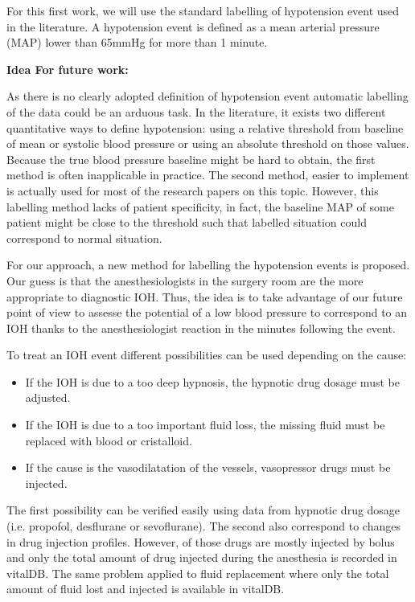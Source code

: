 \documentclass[a4paper,12pt]{article}
\begin{document}
For this first work, we will use the standard labelling of hypotension event used in the literature. A hypotension event is defined as a mean arterial pressure (MAP) lower than 65mmHg for more than 1 minute. \medskip

\textbf{Idea For future work:}



As there is no clearly adopted definition of hypotension event automatic labelling of the data could be an arduous task. In the literature, it exists two different quantitative ways to define hypotension: using a relative threshold from baseline of mean or systolic blood pressure or using an absolute threshold on those values. Because the true blood pressure baseline might be hard to obtain, the first method is often inapplicable in practice. The second method, easier to implement is actually used for most of the research papers on this topic. However, this labelling method lacks of patient specificity, in fact, the baseline MAP of some patient might be close to the threshold such that labelled situation could correspond to normal situation. \medskip

For our approach, a new method for labelling the hypotension events is proposed. Our guess is that the anesthesiologists in the surgery room are the more appropriate to diagnostic IOH. Thus, the idea is to take advantage of our future point of view to assesse the potential of a low blood pressure to correspond to an IOH thanks to the anesthesiologist reaction in the minutes following the event. \medskip

To treat an IOH event different possibilities can be used depending on the cause:
\begin{itemize}
    \item If the IOH is due to a too deep hypnosis, the hypnotic drug dosage must be adjusted.
    \item If the IOH is due to a too important fluid loss, the missing fluid must be replaced with blood or cristalloid.
    \item If the cause is the vasodilatation of the vessels, vasopressor drugs must be injected.
\end{itemize}

The first possibility can be verified easily using data from hypnotic drug dosage (i.e. propofol, desflurane or sevoflurane). The second also correspond to changes in drug injection profiles. However, of those drugs are mostly injected by bolus and only the total amount of drug injected during the anesthesia is recorded in vitalDB. The same problem applied to fluid replacement where only the total amount of fluid lost and injected is available in vitalDB. \medskip
\end{document}
